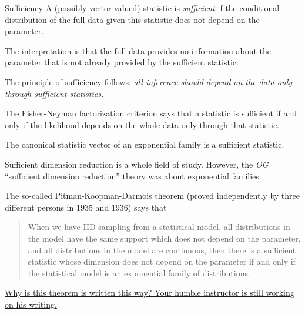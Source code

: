 \documentclass[
  ignorenonframetext,
]{beamer}
\begin{document}
\begin{frame}{Sufficiency}
\protect\hypertarget{sufficiency}{}
A (possibly vector-valued) statistic is \emph{sufficient} if the
conditional distribution of the full data given this statistic does not
depend on the parameter.

\vspace{12pt}

The interpretation is that the full data provides no information about
the parameter that is not already provided by the sufficient statistic.

\vspace{12pt}

The principle of sufficiency follows: \emph{all inference should depend
on the data only through sufficient statistics.}
\end{frame}

\begin{frame}{}
\protect\hypertarget{section-9}{}
The Fisher-Neyman factorization criterion says that a statistic is
sufficient if and only if the likelihood depends on the whole data only
through that statistic.

\vspace{12pt}
\begin{lem}
The canonical statistic vector of an exponential family is a sufficient statistic.
\end{lem}
\end{frame}

\begin{frame}{}
\protect\hypertarget{section-10}{}
Sufficient dimension reduction is a whole field of study. However, the
\emph{OG} ``sufficient dimension reduction'' theory was about
exponential families.

\vspace{12pt}

The so-called Pitman-Koopman-Darmois theorem (proved independently by
three different persons in 1935 and 1936) says that

\vspace{12pt}

\begin{quote}
When we have IID sampling from a statistical model, all distributions in
the model have the same support which does not depend on the parameter,
and all distributions in the model are continuous, then there is a
sufficient statistic whose dimension does not depend on the parameter if
and only if the statistical model is an exponential family of
distributions.
\end{quote}

\vspace{12pt}

\href{http://users.stat.umn.edu/~geyer/math.pdf}{Why is this theorem is
written this way? Your humble instructor is still working on his
writing.}
\end{frame}
\end{document}
